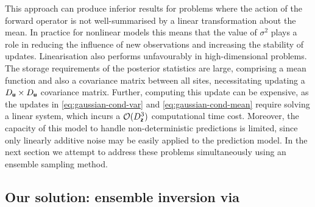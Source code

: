 This approach can produce inferior results for problems where the action of the forward operator is not well-summarised by a linear transformation about the mean.
In practice for nonlinear models this means that the value of \(\sigma^2\) plays a role in reducing the influence of new observations and increasing the stability of updates.
Linearisation also performs unfavourably in high-dimensional problems.
The storage requirements of the  posterior statistics are large, comprising a mean function and also a covariance matrix between all sites, necessitating updating a \(D_{\boldsymbol{\mathsf{u}}}\times D_{\boldsymbol{\mathsf{u}}}\) covariance matrix. 
Further, computing this update can be  expensive, as the updates in \eqref{eq:gaussian-cond-var} and \eqref{eq:gaussian-cond-mean} require solving a linear system, which incurs a \(\mathcal{O}(D_{\boldsymbol{\mathsf{\boldsymbol{\mathsf{z}}}}}^3)\) computational time cost.
Moreover, the capacity of this model to handle non-deterministic predictions is limited, since only linearly additive noise may be easily applied to the prediction model.
In the next section we attempt to address these problems simultaneously using an ensemble sampling method.

\subsection{Our solution: ensemble inversion via \meth{}}\label{sec:EnsembleInversion}

